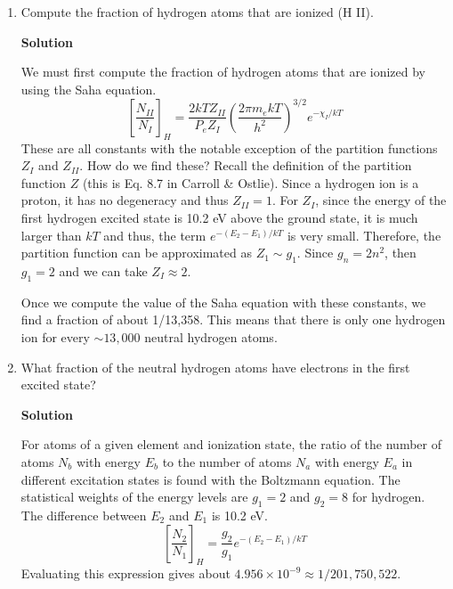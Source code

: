 \documentclass[12pt]{article}
\begin{document}
\begin{enumerate}[label=(\alph*)]
\item Compute the fraction of hydrogen atoms that are ionized (H II).
\setcounter{equation}{0}
\vspace{0.5cm}
\begin{adjustwidth}{2.5em}{0pt}
\begin{siderules}
 {\color{blue} \textbf{Solution}
 
We must first compute the fraction of hydrogen atoms that are ionized by using the Saha equation.
\begin{equation}
\left[\frac{N_{II}}{N_I}\right]_H = \frac{2kTZ_{II}}{P_e Z_I}\left(\frac{2\pi m_e kT}{h^2}\right)^{3/2} e^{-\chi_I/kT}
\end{equation}
These are all constants with the notable exception of the partition functions $Z_I$ and $Z_{II}$. How do we find these? Recall the definition of the partition function $Z$ (this is Eq. 8.7 in Carroll \& Ostlie). Since a hydrogen ion is a proton, it has no degeneracy and thus $Z_{II} = 1$. For $Z_I$, since the energy of the first hydrogen excited state is 10.2 eV above the ground state, it is much larger than $kT$ and thus, the term $e^{-(E_2 - E_1)/kT}$ is very small. Therefore, the partition function can be approximated as $Z_1 \sim g_1$. Since $g_n = 2n^2$, then $g_1 = 2$ and we can take $Z_I \approx 2$.

Once we compute the value of the Saha equation with these constants, we find a fraction of about 1/13,358. This means that there is only one hydrogen ion for every $\sim 13,000$ neutral hydrogen atoms.
 }
\end{siderules}
\end{adjustwidth}

\item What fraction of the neutral hydrogen atoms have electrons in the first excited state?


\vspace{0.5cm}
\begin{adjustwidth}{2.5em}{0pt}
\begin{siderules}
 {\color{blue} \textbf{Solution}
 
For atoms of a given element and ionization state, the ratio of the number of atoms $N_b$ with energy $E_b$ to the number of atoms $N_a$ with energy $E_a$ in different excitation states is found with the Boltzmann equation. The statistical weights of the energy levels are $g_1 = 2$ and $g_2 = 8$ for hydrogen. The difference between $E_2$ and $E_1$ is 10.2 eV.
\begin{equation}
\left[\frac{N_2}{N_1}\right]_H = \frac{g_2}{g_1} e^{-(E_2 - E_1)/kT}
\end{equation}
Evaluating this expression gives about $4.956 \times 10^{-9} \approx 1/201,750,522$.
 }
\end{siderules}
\end{adjustwidth}


\end{enumerate}
\end{document}

